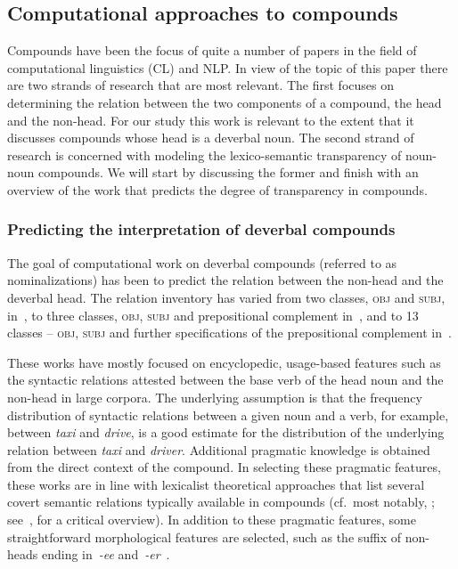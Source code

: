 \documentclass[output=paper]{langsci/langscibook}
\begin{document}
\subsection{Computational approaches to compounds}\label{sec:NLP:lit}
Compounds have been the focus of quite a number of papers in the field of computational linguistics (CL) and NLP. In view of the topic of this paper there are two strands of research that are most relevant. The first  focuses on determining the relation between the two components of a compound, the head and the non-head. 
For our study this work is relevant to the extent that it discusses compounds whose head is a deverbal noun.  
The second strand of research is concerned with modeling the  {lexico-semantic transparency} of noun-noun compounds. We will start by discussing the former and finish with an overview of the work that predicts the degree of  {transparency} in compounds.

\subsubsection{Predicting the interpretation of  {deverbal} compounds}\label{sec:NLP:lit:predictions}
The goal of computational work on deverbal compounds (referred to as nominalizations) has been to predict the relation between the non-head and the deverbal head. The relation inventory  
has varied from two classes, \textsc{obj} and \textsc{subj}, in~\cite{lapata:02}, to three classes, \textsc{obj}, \textsc{subj} and prepositional complement in~\cite{NicholsonBaldwin:06}, and to 13 classes -- \textsc{obj}, \textsc{subj} and further specifications of the prepositional complement in~\cite{grover:lapata:lascarides:05}. 

These works have mostly focused on encyclopedic, usage-based features such as the syntactic relations attested between the base verb of the head noun 
and the non-head in large corpora. The underlying assumption is that the frequency distribution of syntactic relations between a given noun and a verb, for example, between \textit{taxi} and \textit{drive}, is a good estimate for the distribution of the underlying relation between \textit{taxi} and \textit{driver}. Additional pragmatic knowledge is obtained  from the direct context of the compound.
In selecting these pragmatic features, these works are in line with lexicalist theoretical approaches that list several covert semantic relations typically available in compounds (cf.\ most notably, \citealt{levi:78}; see~\citealt{fokkens:07}, for a critical overview). In addition to these pragmatic features, some 
straightforward morphological features are selected, such as the suffix of non-heads ending in~\textit{-ee} and~\textit{-er}~\citep{lapata:02}.
\end{document}
